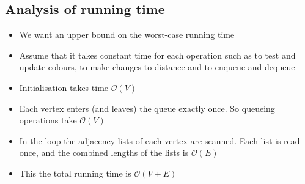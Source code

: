 \documentclass{article}[18pt]
\begin{document}
\subsection{Analysis of running time}
\begin{itemize}
	\item We want an upper bound on the worst-case running time
	\item Assume that it takes constant time for each operation such as to test and update colours, to make changes to distance and to enqueue and dequeue
	\item Initialisation takes time $\mathcal{O}(V)$
	\item Each vertex enters (and leaves) the queue exactly once. So queueing operations take $\mathcal{O}(V)$
	\item In the loop the adjacency lists of each vertex are scanned. Each list is read once, and the combined lengths of the lists is $\mathcal{O}(E)$
	\item This the total running time is $\mathcal{O}(V+E)$
\end{itemize}
\end{document}
